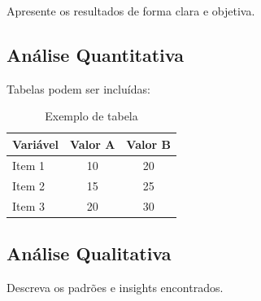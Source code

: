 
Apresente os resultados de forma clara e objetiva.

\subsection{Análise Quantitativa}

Tabelas podem ser incluídas:

\begin{table}[h]
    \centering
    \caption{Exemplo de tabela}
    \begin{tabular}{|l|c|c|}
        \hline
        \textbf{Variável} & \textbf{Valor A} & \textbf{Valor B} \\
        \hline
        Item 1 & 10 & 20 \\
        Item 2 & 15 & 25 \\
        Item 3 & 20 & 30 \\
        \hline
    \end{tabular}
    \label{tab:exemplo}
\end{table}

\subsection{Análise Qualitativa}

Descreva os padrões e insights encontrados.
